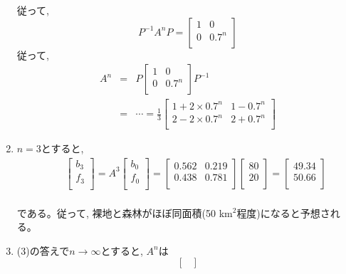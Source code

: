 \begin{enumerate}
\begin{equation}
\end{equation}
従って, 
\begin{equation}
P^{-1}A^nP
=\begin{bmatrix}
1 & 0\\
0 & 0.7^n\\
\end{bmatrix}
\end{equation}
従って, 
\begin{eqnarray*}
A^n
&=&P\begin{bmatrix}
1 & 0\\
0 & 0.7^n\\
\end{bmatrix}P^{-1}\\
&=&\cdots=\frac{1}{3}\begin{bmatrix}
1+2\times0.7^n & 1-0.7^n\\
2-2\times0.7^n & 2+0.7^n\\
\end{bmatrix}
\end{eqnarray*}
\item $n=3$とすると, \\
\begin{eqnarray*}
&&\begin{bmatrix}
b_3\\
f_3\\
\end{bmatrix}
=A^3\begin{bmatrix}
b_0\\
f_0\\
\end{bmatrix}
=\begin{bmatrix}
0.562 & 0.219\\
0.438 & 0.781\\
\end{bmatrix}
\begin{bmatrix}
80\\
20\\
\end{bmatrix}
=\begin{bmatrix}
49.34\\
50.66\\
\end{bmatrix}
\end{eqnarray*}
\\である。従って, 裸地と森林がほぼ同面積(50$\,\,$km$^2$程度)になると予想される。
\item (3)の答えで$n\rightarrow\infty$とすると, $A^n$は
\begin{equation}
\begin{bmatrix}

\end{bmatrix}
\end{equation}
\end{enumerate}
